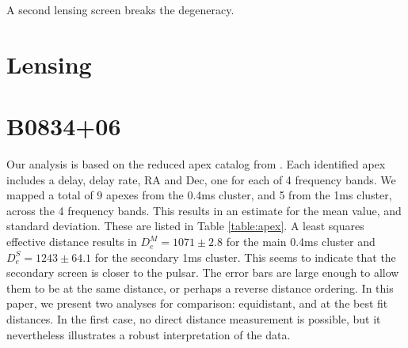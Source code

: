 \documentclass[useAMS,usenatbib]{mn2e}
\begin{document}
A second lensing screen breaks the degeneracy.

\section{Lensing}

\section{B0834+06}


Our analysis is based on the reduced apex catalog from
\citet{2010ApJ...708..232B}. Each identified apex includes a delay,
delay rate, RA and Dec, one for each of 4 frequency bands.  We mapped
a total of 9 apexes from the 0.4ms cluster, and 5 from the 1ms
cluster, across the 4 frequency bands.  This results in an estimate
for the mean value, and standard deviation.  These are listed in Table
\ref{table:apex}.  A least squares effective distance results in
$D_e^M=1071\pm 2.8$ for the main 0.4ms cluster and $D_e^S = 1243 \pm 64.1$ for
the secondary 1ms cluster.  This seems to indicate that the secondary
screen is closer to the pulsar.  The error bars are large enough to
allow them to be at the same distance, or perhaps a reverse distance
ordering.  In this paper, we present two analyses for comparison:
equidistant, and at the best fit distances.  In the first case, no
direct distance measurement is possible, but it nevertheless
illustrates a robust interpretation of the data.

\end{document}
